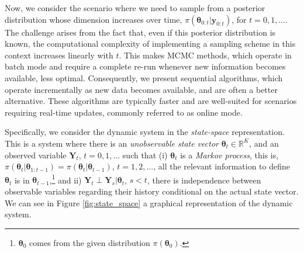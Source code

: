 Now, we consider the scenario where we need to sample from a posterior distribution whose dimension increases over time, $\pi(\bm{\theta}_{0:t}|\bm{y}_{0:t})$, for $t = 0, 1, \dots$. The challenge arises from the fact that, even if this posterior distribution is known, the computational complexity of implementing a sampling scheme in this context increases linearly with $t$. This makes MCMC methods, which operate in batch mode and require a complete re-run whenever new information becomes available, less optimal. Consequently, we present sequential algorithms, which operate incrementally as new data becomes available, and are often a better alternative. These algorithms are typically faster and are well-suited for scenarios requiring real-time updates, commonly referred to as online mode.

Specifically, we consider the dynamic system in the \textit{state-space} representation. This is a system where there is an \textit{unobservable state vector} $\bm{\theta}_t\in\mathbb{R}^K$, and an observed variable $\bm{Y}_t$, $t=0,1,\dots$ such that (i) $\bm{\theta}_t$ is a \textit{Markov process}, this is, $\pi(\bm{\theta}_{t}|\bm{\theta}_{1:t-1})=\pi(\bm{\theta}_{t}|\bm{\theta}_{t-1})$, $t=1,2,\dots$, all the relevant information to define $\bm{\theta}_{t}$ is in $\bm{\theta}_{t-1}$,\footnote{$\bm{\theta}_{0}$ comes from the given distribution $\pi(\bm{\theta}_{0})$.} and ii) $\bm{Y}_t\perp \bm{Y}_s|\bm{\theta}_{t}$, $s<t$, there is independence between observable variables regarding their history conditional on the actual state vector. We can see in Figure \ref{fig:state_space} a graphical representation of the dynamic system.
